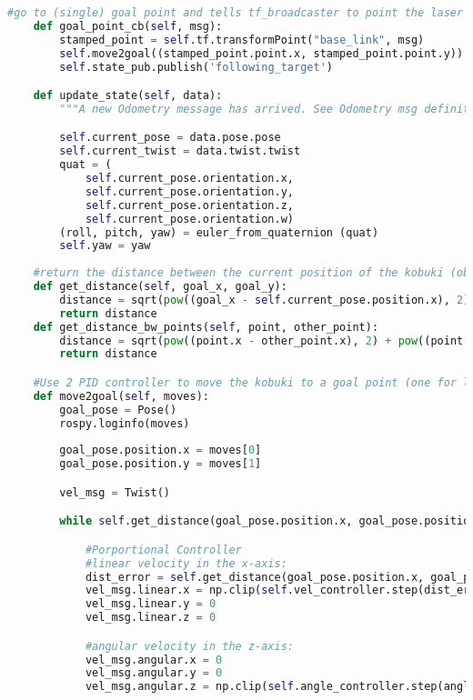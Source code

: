 \begin{lstlisting}[caption={Kobuki Class},label={lst:kobukiclass},language=Python]
    #go to (single) goal point and tells tf_broadcaster to point the laser at it
    def goal_point_cb(self, msg):
        stamped_point = self.tf.transformPoint("base_link", msg)
        self.move2goal((stamped_point.point.x, stamped_point.point.y))
        self.state_pub.publish('following_target')

    def update_state(self, data):
        """A new Odometry message has arrived. See Odometry msg definition."""

        self.current_pose = data.pose.pose
        self.current_twist = data.twist.twist
        quat = (
            self.current_pose.orientation.x,
            self.current_pose.orientation.y,
            self.current_pose.orientation.z,
            self.current_pose.orientation.w)
        (roll, pitch, yaw) = euler_from_quaternion (quat)
        self.yaw = yaw
    
    #return the distance between the current position of the kobuki (obtained with odometry) and a goal point
    def get_distance(self, goal_x, goal_y):
        distance = sqrt(pow((goal_x - self.current_pose.position.x), 2) + pow((goal_y - self.current_pose.position.y), 2))
        return distance
    def get_distance_bw_points(self, point, other_point):
        distance = sqrt(pow((point.x - other_point.x), 2) + pow((point.y - other_point.y), 2))
        return distance

    #Use 2 PID controller to move the kobuki to a goal point (one for linear and one for angular velocity)    
    def move2goal(self, moves):
        goal_pose = Pose()
        rospy.loginfo(moves) 
        
        goal_pose.position.x = moves[0]
        goal_pose.position.y = moves[1]

        vel_msg = Twist()

        while self.get_distance(goal_pose.position.x, goal_pose.position.y) >= distance_tolerance:

            #Porportional Controller
            #linear velocity in the x-axis:
            dist_error = self.get_distance(goal_pose.position.x, goal_pose.position.y) 
            vel_msg.linear.x = np.clip(self.vel_controller.step(dist_error, self.dt), 0.0, max_linear_speed)
            vel_msg.linear.y = 0
            vel_msg.linear.z = 0

            #angular velocity in the z-axis:
            vel_msg.angular.x = 0
            vel_msg.angular.y = 0
            vel_msg.angular.z = np.clip(self.angle_controller.step(angle_difference(atan2(goal_pose.position.y - self.current_pose.position.y, goal_pose.position.x - self.current_pose.position.x), self.yaw), self.dt), -max_angular_speed, max_angular_speed)


\end{lstlisting}
